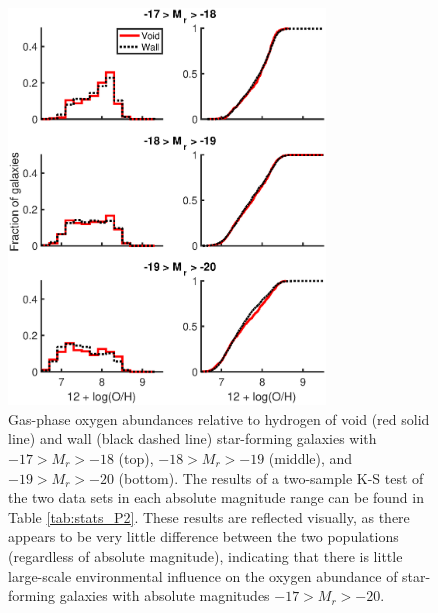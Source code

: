 \begin{figure}
    \centering
    \includegraphics[width=0.75\textwidth]{Images/Paper2/1sig_17-20_SF_t3_12logOH_stacked}
    \caption[Metallicity distribution of star-forming galaxies with 
    $-17 > M_r > -20$]{Gas-phase oxygen abundances relative to hydrogen of void 
    (red solid line) and wall (black dashed line) star-forming galaxies with 
    $-17 > M_r > -18$ (top), $-18 > M_r > -19$ (middle), and $-19 > M_r > -20$ 
    (bottom).  The results of a two-sample K-S test of the two data sets in each 
    absolute magnitude range can be found in Table \ref{tab:stats_P2}.  These 
    results are reflected visually, as there appears to be very little 
    difference between the two populations (regardless of absolute magnitude), 
    indicating that there is little large-scale environmental influence on the 
    oxygen abundance of star-forming galaxies with absolute magnitudes 
    $-17 > M_r > -20$.}
    \label{fig:Z_bright}
\end{figure}

